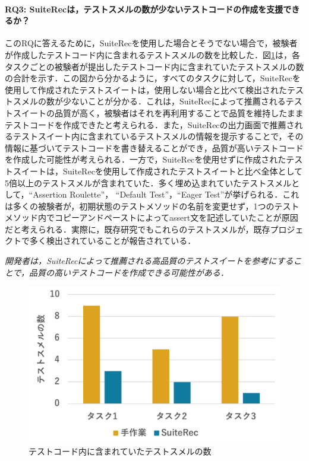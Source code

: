 \documentclass[12pt]{jarticle} %
\begin{document}
\paragraph{RQ3: {\sf SuiteRec}は，テストスメルの数が少ないテストコードの作成を支援できるか？}このRQに答えるために，{\sf SuiteRec}を使用した場合とそうでない場合で，被験者が作成したテストコード内に含まれるテストスメルの数を比較した．図\ref{smell}は，各タスクごとの被験者が提出したテストコード内に含まれていたテストスメルの数の合計を示す．この図から分かるように，すべてのタスクに対して，{\sf SuiteRec}を使用して作成されたテストスイートは，使用しない場合と比べて検出されたテストスメルの数が少ないことが分かる．これは，{\sf SuiteRec}によって推薦されるテストスイートの品質が高く，被験者はそれを再利用することで品質を維持したままテストコードを作成できたと考えられる．また，{\sf SuiteRec}の出力画面で推薦されるテストスイート内に含まれているテストスメルの情報を提示することで，その情報に基づいてテストコードを書き替えることができ，品質が高いテストコードを作成した可能性が考えられる．一方で，{\sf SuiteRec}を使用せずに作成されたテストスイートは，{\sf SuiteRec}を使用して作成されたテストスイートと比べ全体として5倍以上のテストスメルが含まれていた．多く埋め込まれていたテストスメルとして，``Assertion Roulette''， ``Default Test''，``Eager Test''が挙げられる．これは多くの被験者が，初期状態のテストメソッドの名前を変更せず，1つのテストメソッド内でコピーアンドペーストによってassert文を記述していたことが原因だと考えられる．実際に，既存研究でもこれらのテストスメルが，既存プロジェクトで多く検出されていることが報告されている\cite{Peruma}．




\vspace{\baselineskip}

\begin{breakbox}
\textit{開発者は，{\sf SuiteRec}によって推薦される高品質のテストスイートを参考にすることで，品質の高いテストコードを作成できる可能性がある．}
\end{breakbox}

\newpage

\begin{figure}[h]
\begin{center}
\includegraphics[width=12cm]{image/smells.pdf}
\caption{テストコード内に含まれていたテストスメルの数}
\label{smell}
\end{center}
\end{figure}
\end{document}
